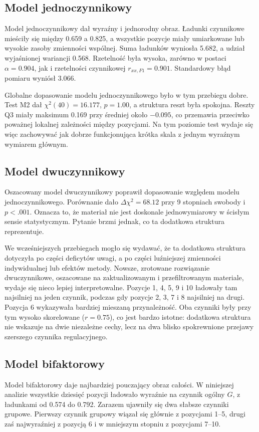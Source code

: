 \documentclass[11pt,a4paper]{article}
\begin{document}
\subsection{Model jednoczynnikowy}
Model jednoczynnikowy dał wyraźny i jednorodny obraz. Ładunki czynnikowe mieściły się między 0.659 a 0.825, a wszystkie pozycje miały umiarkowane lub wysokie zasoby zmienności wspólnej. Suma ładunków wyniosła 5.682, a udział wyjaśnionej wariancji 0.568. Rzetelność była wysoka, zarówno w postaci $\alpha = 0.904$, jak i rzetelności czynnikowej $r_{xx,F1} = 0.901$. Standardowy błąd pomiaru wyniósł 3.066.

Globalne dopasowanie modelu jednoczynnikowego było w tym przebiegu dobre. Test M2 dał $\chi^2(40)=16.177$, $p=1.00$, a struktura reszt była spokojna. Reszty Q3 miały maksimum 0.169 przy średniej około $-0.095$, co przemawia przeciwko poważnej lokalnej zależności między pozycjami. Na tym poziomie test wydaje się więc zachowywać jak dobrze funkcjonująca krótka skala z jednym wyraźnym wymiarem głównym.

\subsection{Model dwuczynnikowy}
Oszacowany model dwuczynnikowy poprawił dopasowanie względem modelu jednoczynnikowego. Porównanie dało $\Delta \chi^2 = 68.12$ przy 9 stopniach swobody i $p < .001$. Oznacza to, że materiał nie jest doskonale jednowymiarowy w ścisłym sensie statystycznym. Pytanie brzmi jednak, co ta dodatkowa struktura reprezentuje.

We wcześniejszych przebiegach mogło się wydawać, że ta dodatkowa struktura dotyczyła po części deficytów uwagi, a po części luźniejszej zmienności indywidualnej lub efektów metody. Nowsze, zrotowane rozwiązanie dwuczynnikowe, oszacowane na zaktualizowanym i przefiltrowanym materiale, wydaje się nieco lepiej interpretowalne. Pozycje 1, 4, 5, 9 i 10 ładowały tam najsilniej na jeden czynnik, podczas gdy pozycje 2, 3, 7 i 8 najsilniej na drugi. Pozycja 6 wykazywała bardziej mieszaną przynależność. Oba czynniki były przy tym wysoko skorelowane ($r = 0.75$), co jest bardzo istotne: dodatkowa struktura nie wskazuje na dwie niezależne cechy, lecz na dwa blisko spokrewnione przejawy szerszego czynnika regulacyjnego.

\subsection{Model bifaktorowy}
Model bifaktorowy daje najbardziej pouczający obraz całości. W niniejszej analizie wszystkie dziesięć pozycji ładowało wyraźnie na czynnik ogólny $G$, z ładunkami od 0.574 do 0.792. Zarazem ujawniły się dwa słabsze czynniki grupowe. Pierwszy czynnik grupowy wiązał się głównie z pozycjami 1--5, drugi zaś najwyraźniej z pozycją 6 i w mniejszym stopniu z pozycjami 7--10.
\end{document}
